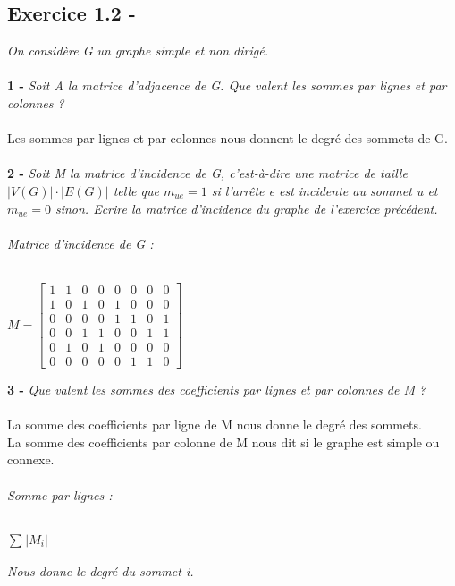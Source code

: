 \documentclass{article}
\begin{document}
\subsection*{Exercice 1.2 -}
\textit{On considère G un graphe simple et non dirigé.}\\\\
\textbf{1 -}
\textit{Soit A la matrice d'adjacence de G. Que valent les sommes par lignes et par colonnes ?}\\\\
\textsf{Les sommes par lignes et par colonnes nous donnent le degré des sommets de G.}\\\\
\textbf{2 -}
\textit{Soit M la matrice d’incidence de G, c’est-à-dire une matrice de taille $\big|V(G)\big| \cdot \big|E(G)\big|$ telle que $m_{ue} = 1$ si l’arrête e est incidente au sommet u et $m_{ue} = 0$ sinon. Ecrire la matrice d’incidence du graphe de l’exercice précédent.}\\\\
\textit{Matrice d'incidence de G :}\\\\
\begin{center}
	$
	M =
	\left[\begin{matrix}
	1&1&0&0&0&0&0&0\\
	1&0&1&0&1&0&0&0\\
	0&0&0&0&1&1&0&1\\
	0&0&1&1&0&0&1&1\\
	0&1&0&1&0&0&0&0\\
	0&0&0&0&0&1&1&0
	\end{matrix}\right]
	$
\end{center}
\textbf{3 -}
\textit{Que valent les sommes des coefficients par lignes et par colonnes de M ?}\\\\
\textsf{La somme des coefficients par ligne de M nous donne le degré des sommets.}\\
\textsf{La somme des coefficients par colonne de M nous dit si le graphe est simple ou connexe.}\\\\
\textit{Somme par lignes :}\\\\
\begin{center}
$\sum_{}\big|M_{i}\big|$\\
\end{center}
\textit{Nous donne le degré du sommet i.}\\\\
\end{document}
